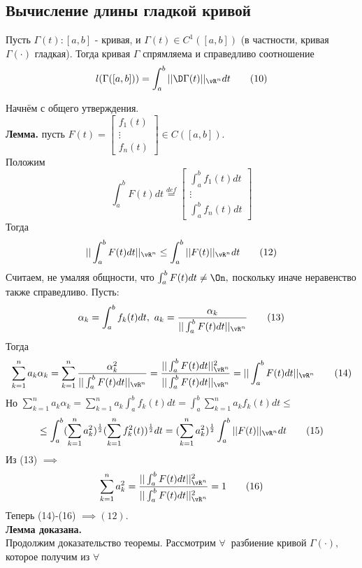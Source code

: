 \documentclass[main]{subfiles}
\begin{document}
\subsection{Вычисление длины гладкой кривой}
\begin{theorem}
    Пусть $\Gamma(t):[a,b]$ - кривая, и $\Gamma(t)\in C^1([a,b])$ (в частности, кривая $\Gamma(\cdot)$ гладкая). Тогда кривая $\Gamma$ спрямляема и справедливо соотношение
    \[ l(\Gamma([a,b]))=\int_a^b||\D\Gamma(t)||_{\vR^n} dt \tag{10} \]
\end{theorem}
\begin{longProof}
    Начнём с общего утверждения.
    \\ \textbf{Лемма.} пусть $F(t)=\begin{bmatrix}
            f_1(t) \\\vdots\\f_n(t)
        \end{bmatrix}\in C([a,b]).$\\
    Положим \[\int_a^b F(t)dt\overset{def}{=}\begin{bmatrix}\int_a^b f_1(t)dt\\\vdots\\\int_a^b f_n(t)dt\end{bmatrix}\tag{11}\]
    Тогда \[ ||\int_a^b F(t)dt||_{\vR^n}\leq \int_a^b ||F(t)||_{\vR^n} dt\tag{12}\]
    Считаем, не умаляя общности, что $\int_a^b F(t)dt\ne\On,$ поскольку иначе неравенство также справедливо. Пусть: \[ \alpha_k =\int_a^b f_k(t)dt,\ a_k=\frac{\alpha_k}{||\int_a^b F(t)dt||_{\vR^n}}\tag{13}\]
    Тогда \[ \sum\limits_{k=1}^n a_k\alpha_k=\sum\limits_{k=1}^n \frac{\alpha_k^2}{||\int_a^b F(t)dt||_{\vR^n}}=\frac{||\int_a^b F(t)dt||^2_{\vR^n}}{||\int_a^b F(t)dt||_{\vR^n}}=||\int_a^b F(t)dt||_{\vR^n}\tag{14}\]
    Но \( \sum\limits_{k=1}^n a_k\alpha_k=\sum\limits_{k=1}^n a_k\int_a^b f_k(t)dt=\int_a^b\sum\limits_{k=1}^n a_k f_k(t)dt\leq\) \[ \leq \int_a^b(\sum\limits_{k=1}^n a_k^2)^\frac{1}{2}(\sum\limits_{k=1}^n f_k^2(t))^\frac{1}{2}dt=(\sum\limits_{k=1}^n a_k^2)^\frac{1}{2}\int_a^b|| F(t)||_{\vR^n} dt\tag{15} \]
    Из (13) $\implies$ \[ \sum\limits_{k=1}^n a_k^2=\frac{||\int_a^b F(t)dt||_{\vR^n}^2}{||\int_a^b F(t)dt||^2_{\vR^n}}=1\tag{16} \]
    Теперь (14)-(16) $\implies (12).$ \\\textbf{Лемма доказана.}\\
    Продолжим доказательство теоремы.
    Рассмотрим $\forall\ $ разбиение кривой $\Gamma(\cdot),$ которое получим из $\forall\ $

\end{longProof}
\end{document}
